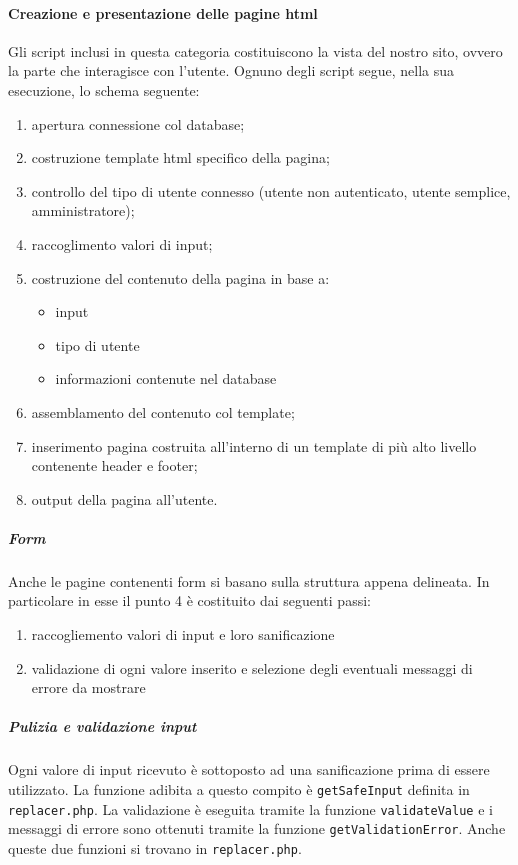 \paragraph{Creazione e presentazione delle pagine html}
Gli script inclusi in questa categoria costituiscono la vista del nostro sito, ovvero la parte che interagisce con l'utente.
Ognuno degli script segue, nella sua esecuzione, lo schema seguente:
\begin{enumerate}
	\item apertura connessione col database;
	\item costruzione template html specifico della pagina;
	\item controllo del tipo di utente connesso (utente non autenticato, utente semplice, amministratore);
	\item raccoglimento valori di input;
	\item costruzione del contenuto della pagina in base a:
	\begin{itemize}
		\item input
		\item tipo di utente
		\item informazioni contenute nel database
	\end{itemize}
	\item assemblamento del contenuto col template;
	\item inserimento pagina costruita all'interno di un template di più alto livello contenente header e footer;
	\item output della pagina all'utente.
\end{enumerate}

\subparagraph{Form}
Anche le pagine contenenti form si basano sulla struttura appena delineata. In particolare in esse il punto 4 è costituito dai seguenti passi:
\begin{enumerate}
	\item raccogliemento valori di input e loro sanificazione
	\item validazione di ogni valore inserito e selezione degli eventuali messaggi di errore da mostrare
\end{enumerate}

\subparagraph{Pulizia e validazione input}
Ogni valore di input ricevuto è sottoposto ad una sanificazione prima di essere utilizzato. La funzione adibita a questo compito è \texttt{getSafeInput} definita in \texttt{replacer.php}. \newline
La validazione è eseguita tramite la funzione \texttt{validateValue} e i messaggi di errore sono ottenuti tramite la funzione \texttt{getValidationError}. Anche queste due funzioni si trovano in \texttt{replacer.php}.

